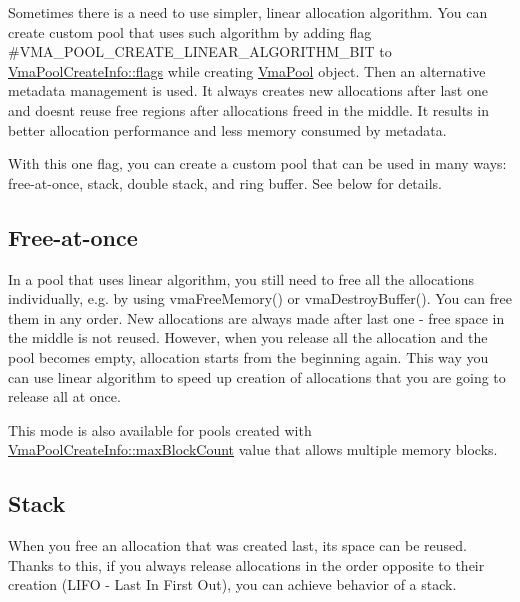 Sometimes there is a need to use simpler, linear allocation algorithm. You can create custom pool that uses such algorithm by adding flag \#\+V\+M\+A\+\_\+\+P\+O\+O\+L\+\_\+\+C\+R\+E\+A\+T\+E\+\_\+\+L\+I\+N\+E\+A\+R\+\_\+\+A\+L\+G\+O\+R\+I\+T\+H\+M\+\_\+\+B\+IT to \hyperlink{structVmaPoolCreateInfo_a8405139f63d078340ae74513a59f5446}{Vma\+Pool\+Create\+Info\+::flags} while creating \hyperlink{structVmaPool}{Vma\+Pool} object. Then an alternative metadata management is used. It always creates new allocations after last one and doesn\textquotesingle{}t reuse free regions after allocations freed in the middle. It results in better allocation performance and less memory consumed by metadata.



With this one flag, you can create a custom pool that can be used in many ways\+: free-\/at-\/once, stack, double stack, and ring buffer. See below for details.\hypertarget{custom_memory_pools_linear_algorithm_free_at_once}{}\subsection{Free-\/at-\/once}\label{custom_memory_pools_linear_algorithm_free_at_once}
In a pool that uses linear algorithm, you still need to free all the allocations individually, e.\+g. by using vma\+Free\+Memory() or vma\+Destroy\+Buffer(). You can free them in any order. New allocations are always made after last one -\/ free space in the middle is not reused. However, when you release all the allocation and the pool becomes empty, allocation starts from the beginning again. This way you can use linear algorithm to speed up creation of allocations that you are going to release all at once.



This mode is also available for pools created with \hyperlink{structVmaPoolCreateInfo_ae41142f2834fcdc82baa4883c187b75c}{Vma\+Pool\+Create\+Info\+::max\+Block\+Count} value that allows multiple memory blocks.\hypertarget{custom_memory_pools_linear_algorithm_stack}{}\subsection{Stack}\label{custom_memory_pools_linear_algorithm_stack}
When you free an allocation that was created last, its space can be reused. Thanks to this, if you always release allocations in the order opposite to their creation (L\+I\+FO -\/ Last In First Out), you can achieve behavior of a stack.



